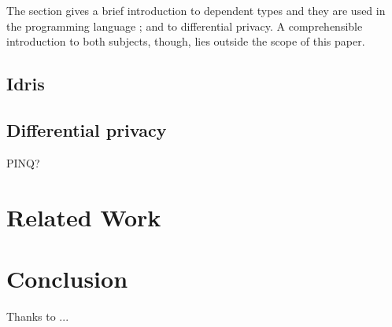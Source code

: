 \documentclass[preprint]{sigplanconf}
\begin{document}
The section gives a brief introduction to dependent types and they are
used in the programming language \idris; and to differential
privacy. A comprehensible introduction to both subjects, though, lies
outside the scope of this paper.

\subsection{Idris}
\label{sec:idris}



\subsection{Differential privacy}
\label{sec:differencial-privacy}

PINQ? 


\section{Related Work}
\label{sec:related-work}


\section{Conclusion}
\label{sec:conclusion}


\acks Thanks to ...







\end{document}
